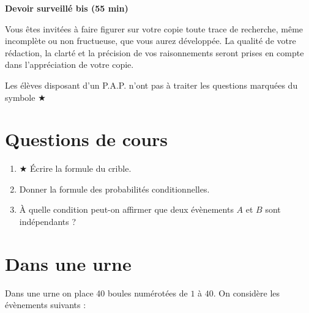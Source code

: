 \documentclass[oneside,12pt]{exam}          %
\begin{document}
\footer{}{\footnotesize \etablissement}{\thepage / \numpages}

\hrulefill\raisebox{-1.9pt}{\quad\decofourleft~\decosix~\decofourright \quad}\hrulefill

\begin{center}
	\textbf{\large Devoir surveillé  bis (55 min)}
\end{center}
\vspace{-5pt}
Vous êtes invité\textperiodcentered e\textperiodcentered s à faire figurer sur votre copie toute trace de recherche, même incomplète ou non fructueuse, que vous aurez développée. La qualité de votre rédaction, la clarté et la précision de vos raisonnements seront prises en compte dans l’appréciation de votre copie.

Les élèves disposant d'un P.A.P. n'ont pas à traiter les questions marquées du symbole $\bigstar$

\vspace{-8pt}\hrulefill\raisebox{-1.9pt}{\quad\decofourleft~\decosix~\decofourright \quad}\hrulefill
\vspace{5pt}



\section{Questions de cours}
\begin{enumerate}[itemsep = 0pt]
	\item $\bigstar$ Écrire la formule du crible.
	\item Donner la formule des probabilités conditionnelles.
	\item À quelle condition peut-on affirmer que deux évènements $A$ et $B$ sont indépendants ?
\end{enumerate}



\section{Dans une urne}
Dans une urne on place 40 boules numérotées de $1$ à $40$. On considère les évènements suivants :
\end{document}
